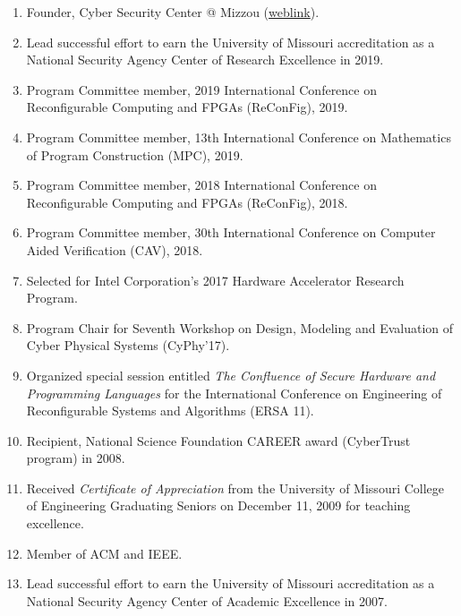 \documentclass[12pt]{article} %
\begin{document}
\begin{enumerate}[leftmargin=0mm]

\item Founder, Cyber Security Center @ Mizzou (\href{https://engineering.missouri.edu/cybersecurity/}{weblink}).

\item Lead successful effort to earn the University of Missouri accreditation as a National Security Agency Center of Research Excellence in 2019. 

\item Program Committee member, 2019 International Conference on Reconfigurable Computing and FPGAs (ReConFig), 2019.

\item Program Committee member, 13th International Conference on
Mathematics of Program Construction (MPC), 2019.

\item Program Committee member, 2018 International Conference on Reconfigurable Computing and FPGAs (ReConFig), 2018.

\item Program Committee member, 30th International Conference on Computer Aided Verification (CAV), 2018.

\item Selected for Intel Corporation's 2017 Hardware Accelerator Research Program.

\item Program Chair for 
Seventh Workshop on Design, Modeling and Evaluation of Cyber Physical Systems (CyPhy'17).

\item Organized special session entitled \emph{The Confluence of Secure Hardware and Programming Languages} for the International Conference on 
Engineering of Reconfigurable Systems and Algorithms (ERSA 11).

\item  Recipient, National Science Foundation CAREER award (CyberTrust program) in 2008.

\item Received \emph{Certificate of Appreciation} from the University of Missouri College of Engineering Graduating Seniors on December 11, 2009 for teaching excellence.

\item Member of ACM and IEEE.

\item Lead successful effort to earn the University of Missouri accreditation as a National Security Agency Center of Academic Excellence in 2007. 


\end{enumerate}
\end{document}
